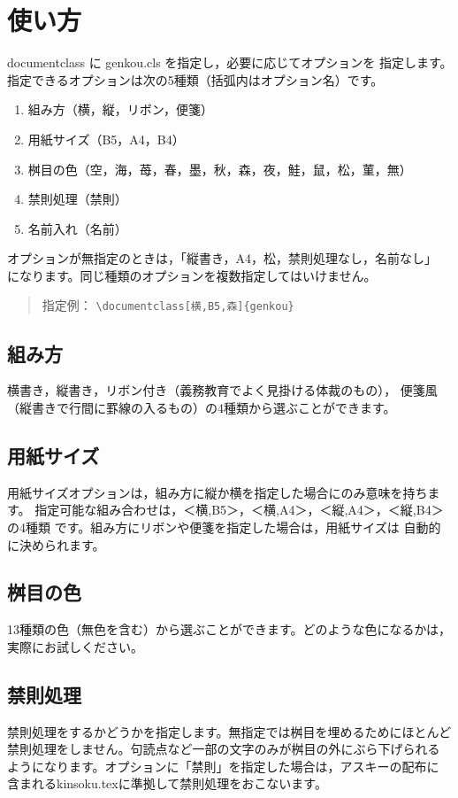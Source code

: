 \documentclass{jarticle}
\begin{document}
\section{使い方}
documentclass に genkou.cls を指定し，必要に応じてオプションを
指定します。指定できるオプションは次の5種類（括弧内はオプション名）です。

\begin{enumerate}
    \item 組み方（横，縦，リボン，便箋）
    \item 用紙サイズ（B5，A4，B4）
    \item 桝目の色（空，海，苺，春，墨，秋，森，夜，鮭，鼠，松，菫，無）
    \item 禁則処理（禁則）
    \item 名前入れ（名前）
\end{enumerate}

オプションが無指定のときは，「縦書き，A4，松，禁則処理なし，名前なし」
になります。同じ種類のオプションを複数指定してはいけません。

\begin{verse}
    指定例： \verb+\documentclass[横,B5,森]{genkou}+
\end{verse}

\subsection{組み方}
横書き，縦書き，リボン付き（義務教育でよく見掛ける体裁のもの），
便箋風（縦書きで行間に罫線の入るもの）の4種類から選ぶことができます。

\subsection{用紙サイズ}
用紙サイズオプションは，組み方に縦か横を指定した場合にのみ意味を持ちます。
指定可能な組み合わせは，＜横,B5＞，＜横,A4＞，＜縦,A4＞，＜縦,B4＞の4種類
です。組み方にリボンや便箋を指定した場合は，用紙サイズは
自動的に決められます。

\subsection{桝目の色}
13種類の色（無色を含む）から選ぶことができます。どのような色になるかは，
実際にお試しください。

\subsection{禁則処理}
禁則処理をするかどうかを指定します。無指定では桝目を埋めるためにほとんど
禁則処理をしません。句読点など一部の文字のみが桝目の外にぶら下げられる
ようになります。オプションに「禁則」を指定した場合は，アスキーの配布に
含まれるkinsoku.texに準拠して禁則処理をおこないます。
\end{document}
